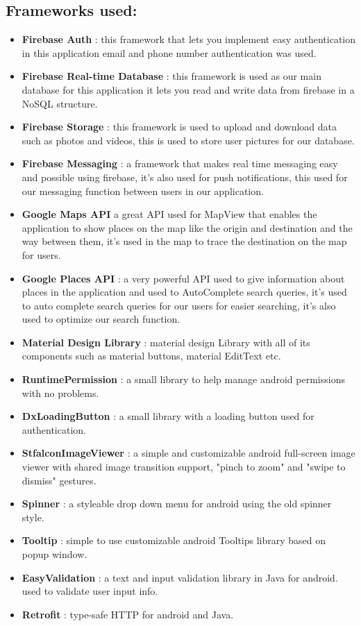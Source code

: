 \subsection{Frameworks used:}
\begin{itemize}
\item \textbf{Firebase Auth }: this framework that lets you implement easy authentication in this application email and phone number authentication was used.
\item \textbf{Firebase Real-time Database }: this framework is used as our main database for this application it lets you read and write data from firebase in a NoSQL structure. 
\item \textbf{Firebase Storage }: this framework is used to upload and download data such as photos and videos, this is used to store user pictures for our database.
\item \textbf{Firebase Messaging }: a framework that makes real time messaging easy and possible using firebase, it’s also used for push notifications, this used for our messaging function between users in our application. 
\item \textbf{ Google Maps API }a great API used for MapView that enables the application to show places on the map like the origin and destination and the way between them, it’s used in the map to trace the destination on the map for users.
\item \textbf{Google Places API }: a very powerful API used to give information about places in the application and used to AutoComplete search queries, it’s used to auto complete search queries for our users for easier searching, it’s also used to optimize our search function.
\item \textbf{Material Design Library }: material design Library with all of its components such as material buttons, material EditText etc.
\item \textbf{RuntimePermission }: a small library to help manage android permissions with no problems. 
\item \textbf{DxLoadingButton }: a small library with a loading button used for authentication. 
\item \textbf{StfalconImageViewer }: a simple and customizable android full-screen image viewer with shared image transition support, "pinch to zoom" and "swipe to dismiss" gestures.
\item \textbf{Spinner }: a styleable drop down menu for android using the old spinner style. 
\item \textbf{Tooltip }: simple to use customizable android Tooltips library based on popup window. 
\item \textbf{EasyValidation }: a text and input validation library in Java for android. used to validate user input info.
\item \textbf{Retrofit }: type-safe HTTP for android and Java.
\end{itemize}

